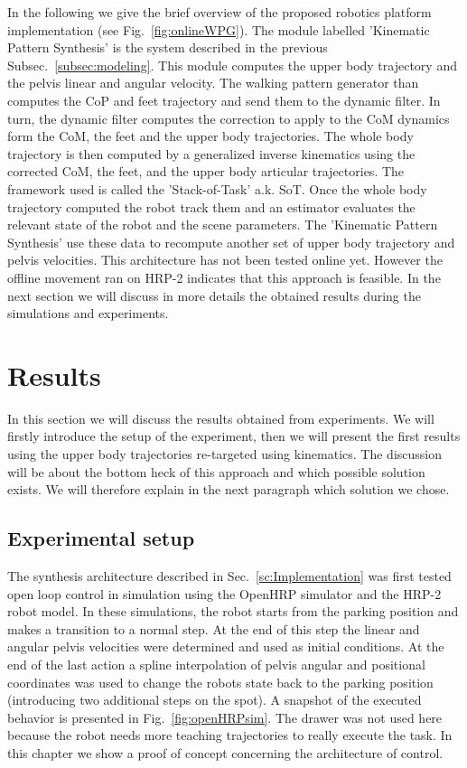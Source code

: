 In the following we give the brief overview of the proposed robotics platform implementation (see Fig.~\ref{fig:onlineWPG}).
The module labelled 'Kinematic Pattern Synthesis' is the system described in the previous Subsec.~\ref{subsec:modeling}.
This module computes the upper body trajectory and the pelvis linear and angular velocity.
The walking pattern generator than computes the CoP and feet trajectory and send them to the dynamic filter.
In turn, the dynamic filter computes the correction to apply to the CoM dynamics form the CoM, the feet and the upper body trajectories.
The whole body trajectory is then computed by a generalized inverse kinematics using the corrected CoM, the feet, and the upper body articular trajectories.
The framework used is called the 'Stack-of-Task' a.k. SoT.
Once the whole body trajectory computed the robot track them and an estimator evaluates the relevant state of the robot and the scene parameters.
The 'Kinematic Pattern Synthesis' use these data to recompute another set of upper body trajectory and pelvis velocities.
This architecture has not been tested online yet.
However the offline movement ran on HRP-2 indicates that this approach is feasible.
In the next section we will discuss in more details the obtained results during the simulations and experiments.

\section{Results}
\label{sc:Results}

In this section we will discuss the results obtained from experiments.
We will firstly introduce the setup of the experiment, then we will present the first results using the upper body trajectories re-targeted using kinematics.
The discussion will be about the bottom heck of this approach and which possible solution exists.
We will therefore explain in the next paragraph which solution we chose.

\subsection{Experimental setup}

The synthesis architecture described in Sec.~\ref{sc:Implementation} was first tested open loop control in simulation using the OpenHRP simulator and the HRP-2 robot model.
In these simulations, the robot starts from the parking position and makes a transition to a normal step.
At the end of this step the linear and angular pelvis velocities were determined and used as initial conditions.
At the end of the last action a spline interpolation of pelvis angular and positional coordinates was used to change the robots state back to the parking position (introducing
 two additional steps on the spot). A snapshot of the executed behavior is presented in Fig.~\ref{fig:openHRPsim}.
 The drawer was not used here because the robot needs more teaching trajectories to really execute the task.
 In this chapter we show a proof of concept concerning the architecture of control.
 
